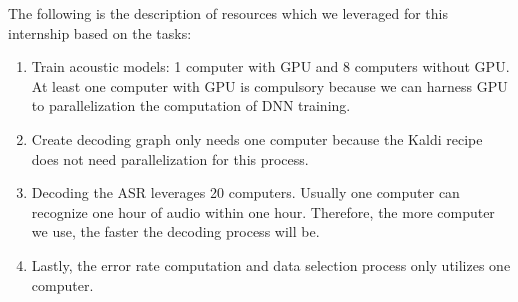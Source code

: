 The following is the description of resources which we leveraged for this internship based on the tasks:
\begin{enumerate}
\item Train acoustic models: 1 computer with GPU and 8 computers without GPU. At least one computer with GPU is compulsory because we can harness GPU to parallelization the computation of DNN training. 
\item Create decoding graph only needs one computer because the Kaldi recipe does not need parallelization for this process.
\item Decoding the ASR leverages 20 computers. Usually one computer can recognize one hour of audio within one hour. Therefore, the more computer we use, the faster the decoding process will be. 
\item Lastly, the error rate computation and data selection process only utilizes one computer. 
\end{enumerate}

